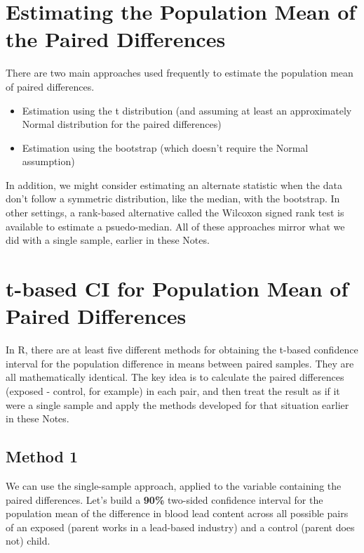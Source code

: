 \documentclass[
]{book}
\providecommand{\tightlist}{%
  \setlength{\itemsep}{0pt}\setlength{\parskip}{0pt}}
\begin{document}
\hypertarget{estimating-the-population-mean-of-the-paired-differences}{%
\section{Estimating the Population Mean of the Paired Differences}\label{estimating-the-population-mean-of-the-paired-differences}}

There are two main approaches used frequently to estimate the population mean of paired differences.

\begin{itemize}
\tightlist
\item
  Estimation using the t distribution (and assuming at least an approximately Normal distribution for the paired differences)
\item
  Estimation using the bootstrap (which doesn't require the Normal assumption)
\end{itemize}

In addition, we might consider estimating an alternate statistic when the data don't follow a symmetric distribution, like the median, with the bootstrap. In other settings, a rank-based alternative called the Wilcoxon signed rank test is available to estimate a psuedo-median. All of these approaches mirror what we did with a single sample, earlier in these Notes.

\hypertarget{t-based-ci-for-population-mean-of-paired-differences}{%
\section{t-based CI for Population Mean of Paired Differences}\label{t-based-ci-for-population-mean-of-paired-differences}}

In R, there are at least five different methods for obtaining the t-based confidence interval for the population difference in means between paired samples. They are all mathematically identical. The key idea is to calculate the paired differences (exposed - control, for example) in each pair, and then treat the result as if it were a single sample and apply the methods developed for that situation earlier in these Notes.

\hypertarget{method-1}{%
\subsection{Method 1}\label{method-1}}

We can use the single-sample approach, applied to the variable containing the paired differences. Let's build a \textbf{90\%} two-sided confidence interval for the population mean of the difference in blood lead content across all possible pairs of an exposed (parent works in a lead-based industry) and a control (parent does not) child.
\end{document}
